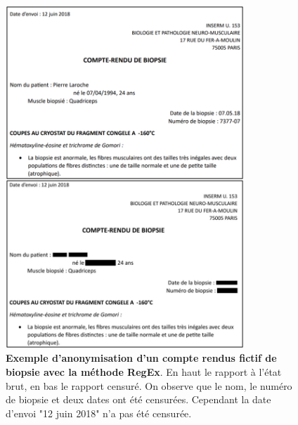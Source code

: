 \begin{figure}[!ht]
 \centering
 \includegraphics[width=0.8\textwidth]{figures/regex.png}
 \caption[Exemple anonymisation RegEx]{\textbf{Exemple d'anonymisation d'un compte rendus fictif de biopsie avec la méthode RegEx}. En haut le rapport à l'état brut, en bas le rapport censuré. On observe que le nom, le numéro de biopsie et deux dates ont été censurées. Cependant la date d'envoi "12 juin 2018" n'a pas été censurée.}
 \label{fig:regex}
\end{figure}

